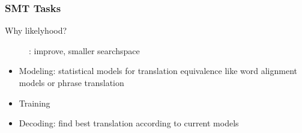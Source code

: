 \subsubsection{SMT Tasks}

\begin{description}
	\item[Why likelyhood?]: improve, smaller searchspace
\end{description}
\begin{itemize}
	\item Modeling: statistical models for translation equivalence like word alignment models or phrase translation
	\item Training
	\item Decoding: find best translation according to current models
\end{itemize}






